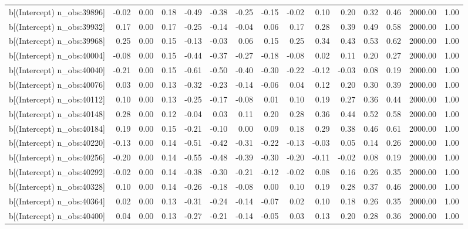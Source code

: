 \begin{table}[ht]
\begin{tabular}{rrrrrrrrrrrrrrr}
  b[(Intercept) n\_obs:39896] & -0.02 & 0.00 & 0.18 & -0.49 & -0.38 & -0.25 & -0.15 & -0.02 & 0.10 & 0.20 & 0.32 & 0.46 & 2000.00 & 1.00 \\ 
  b[(Intercept) n\_obs:39932] & 0.17 & 0.00 & 0.17 & -0.25 & -0.14 & -0.04 & 0.06 & 0.17 & 0.28 & 0.39 & 0.49 & 0.58 & 2000.00 & 1.00 \\ 
  b[(Intercept) n\_obs:39968] & 0.25 & 0.00 & 0.15 & -0.13 & -0.03 & 0.06 & 0.15 & 0.25 & 0.34 & 0.43 & 0.53 & 0.62 & 2000.00 & 1.00 \\ 
  b[(Intercept) n\_obs:40004] & -0.08 & 0.00 & 0.15 & -0.44 & -0.37 & -0.27 & -0.18 & -0.08 & 0.02 & 0.11 & 0.20 & 0.27 & 2000.00 & 1.00 \\ 
  b[(Intercept) n\_obs:40040] & -0.21 & 0.00 & 0.15 & -0.61 & -0.50 & -0.40 & -0.30 & -0.22 & -0.12 & -0.03 & 0.08 & 0.19 & 2000.00 & 1.00 \\ 
  b[(Intercept) n\_obs:40076] & 0.03 & 0.00 & 0.13 & -0.32 & -0.23 & -0.14 & -0.06 & 0.04 & 0.12 & 0.20 & 0.30 & 0.39 & 2000.00 & 1.00 \\ 
  b[(Intercept) n\_obs:40112] & 0.10 & 0.00 & 0.13 & -0.25 & -0.17 & -0.08 & 0.01 & 0.10 & 0.19 & 0.27 & 0.36 & 0.44 & 2000.00 & 1.00 \\ 
  b[(Intercept) n\_obs:40148] & 0.28 & 0.00 & 0.12 & -0.04 & 0.03 & 0.11 & 0.20 & 0.28 & 0.36 & 0.44 & 0.52 & 0.58 & 2000.00 & 1.00 \\ 
  b[(Intercept) n\_obs:40184] & 0.19 & 0.00 & 0.15 & -0.21 & -0.10 & 0.00 & 0.09 & 0.18 & 0.29 & 0.38 & 0.46 & 0.61 & 2000.00 & 1.00 \\ 
  b[(Intercept) n\_obs:40220] & -0.13 & 0.00 & 0.14 & -0.51 & -0.42 & -0.31 & -0.22 & -0.13 & -0.03 & 0.05 & 0.14 & 0.26 & 2000.00 & 1.00 \\ 
  b[(Intercept) n\_obs:40256] & -0.20 & 0.00 & 0.14 & -0.55 & -0.48 & -0.39 & -0.30 & -0.20 & -0.11 & -0.02 & 0.08 & 0.19 & 2000.00 & 1.00 \\ 
  b[(Intercept) n\_obs:40292] & -0.02 & 0.00 & 0.14 & -0.38 & -0.30 & -0.21 & -0.12 & -0.02 & 0.08 & 0.16 & 0.26 & 0.35 & 2000.00 & 1.00 \\ 
  b[(Intercept) n\_obs:40328] & 0.10 & 0.00 & 0.14 & -0.26 & -0.18 & -0.08 & 0.00 & 0.10 & 0.19 & 0.28 & 0.37 & 0.46 & 2000.00 & 1.00 \\ 
  b[(Intercept) n\_obs:40364] & 0.02 & 0.00 & 0.13 & -0.31 & -0.24 & -0.14 & -0.07 & 0.02 & 0.10 & 0.18 & 0.26 & 0.35 & 2000.00 & 1.00 \\ 
  b[(Intercept) n\_obs:40400] & 0.04 & 0.00 & 0.13 & -0.27 & -0.21 & -0.14 & -0.05 & 0.03 & 0.13 & 0.20 & 0.28 & 0.36 & 2000.00 & 1.00 \\ 

\end{tabular}
\end{table}
